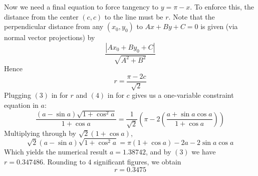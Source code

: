 \documentclass[12pt]{article}
\begin{document}
{Now we need a final equation to force tangency to $y = \pi - x$. To enforce this, the distance from the center $(c,c)$ to the line must be $r$. Note that the perpendicular distance from any $(x_0, y_0)$ to $Ax + By + C = 0$ is given (via normal vector projections) by $$\frac{|Ax_0 + By_0 + C|}{\sqrt{A^2 + B^2}}$$
Hence 
\begin{equation}
r = \frac{\pi - 2c}{\sqrt{2}}
\end{equation}
Plugging $(3)$ in for $r$ and $(4)$ in for $c$ gives us a one-variable constraint equation in $a$:
\begin{equation*}
\frac{(a - \sin a) \sqrt{1 + \cos^2{a}}}{1 + \cos a} = \frac{1}{\sqrt{2}} \left( \pi - 2 \left( \frac{a + \sin{a}\cos{a}}{1 + \cos{a}}  \right) \right)
\end{equation*}
Multiplying through by $\sqrt{2} (1 + \cos{a})$,
\begin{equation*}
\sqrt{2} (a - \sin a) \sqrt{1 + \cos^2{a}} = \pi (1 + \cos{a}) - 2a - 2\sin{a}\cos{a}
\end{equation*}
Which yields the numerical result $a = 1.38742$, and by $(3)$ we have $r = 0.347486$. Rounding to $4$ significant figures, we obtain $$\boxed{r = 0.3475}$$
}
\end{document}
